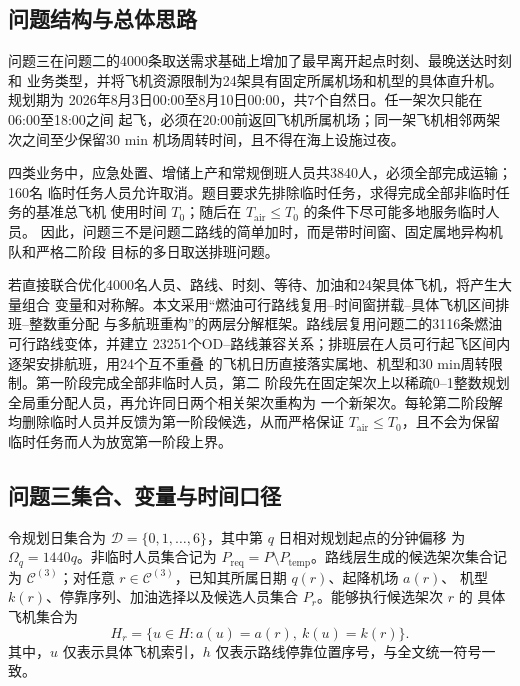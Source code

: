 \documentclass[UTF8,a4paper,zihao=5]{ctexart}
\begin{document}
\subsection{问题结构与总体思路}

问题三在问题二的4000条取送需求基础上增加了最早离开起点时刻、最晚送达时刻和
业务类型，并将飞机资源限制为24架具有固定所属机场和机型的具体直升机。规划期为
2026年8月3日00:00至8月10日00:00，共7个自然日。任一架次只能在06:00至18:00之间
起飞，必须在20:00前返回飞机所属机场；同一架飞机相邻两架次之间至少保留30 min
机场周转时间，且不得在海上设施过夜。

四类业务中，应急处置、增储上产和常规倒班人员共3840人，必须全部完成运输；160名
临时任务人员允许取消。题目要求先排除临时任务，求得完成全部非临时任务的基准总飞机
使用时间 $T_0$；随后在 $T_{\mathrm{air}}\le T_0$ 的条件下尽可能多地服务临时人员。
因此，问题三不是问题二路线的简单加时，而是带时间窗、固定属地异构机队和严格二阶段
目标的多日取送排班问题。

若直接联合优化4000名人员、路线、时刻、等待、加油和24架具体飞机，将产生大量组合
变量和对称解。本文采用“燃油可行路线复用--时间窗拼载--具体飞机区间排班--整数重分配
与多航班重构”的两层分解框架。路线层复用问题二的3116条燃油可行路线变体，并建立
23251个OD--路线兼容关系；排班层在人员可行起飞区间内逐架安排航班，用24个互不重叠
的飞机日历直接落实属地、机型和30 min周转限制。第一阶段完成全部非临时人员，第二
阶段先在固定架次上以稀疏0--1整数规划全局重分配人员，再允许同日两个相关架次重构为
一个新架次。每轮第二阶段解均删除临时人员并反馈为第一阶段候选，从而严格保证
$T_{\mathrm{air}}\le T_0$，且不会为保留临时任务而人为放宽第一阶段上界。

\subsection{问题三集合、变量与时间口径}

令规划日集合为 $\mathcal{D}=\{0,1,\ldots,6\}$，其中第 $q$ 日相对规划起点的分钟偏移
为 $\Omega_q=1440q$。非临时人员集合记为
$P_{\mathrm{req}}=P\setminus P_{\mathrm{temp}}$。路线层生成的候选架次集合记为
$\mathcal{C}^{(3)}$；对任意 $r\in\mathcal{C}^{(3)}$，已知其所属日期 $q(r)$、起降机场 $a(r)$、
机型 $k(r)$、停靠序列、加油选择以及候选人员集合 $P_r$。能够执行候选架次 $r$ 的
具体飞机集合为
\begin{equation}
  H_r=\{u\in H:a(u)=a(r),\ k(u)=k(r)\}.
  \label{eq:q3-compatible-aircraft}
\end{equation}
其中，$u$ 仅表示具体飞机索引，$h$ 仅表示路线停靠位置序号，与全文统一符号一致。
\end{document}
